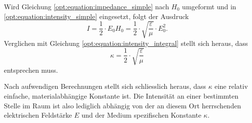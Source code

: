 Wird Gleichung \eqref{opt:equation:impedance_simple} nach $H_0$ umgeformt und in \eqref{opt:equation:intensity_simple} eingesetzt, folgt der Ausdruck
\begin{equation*}
I
=
\frac{1}{2} \cdot E_0 H_0
=
\frac{1}{2} \cdot \sqrt{\frac{\varepsilon}{\mu}} \cdot E_0^2
.
\end{equation*}
Verglichen mit Gleichung \eqref{opt:equation:intensity_integral} stellt sich heraus, dass
\begin{equation*}
\kappa
=
\frac{1}{2} \cdot \sqrt{\frac{\varepsilon}{\mu}}
\end{equation*}
entsprechen muss.

Nach aufwendigen Berechnungen stellt sich schliesslich heraus, dass $\kappa$ eine relativ einfache, materialabhängige Konstante ist.
Die Intensität an einer bestimmten Stelle im Raum ist also lediglich abhängig von der an diesem Ort herrschenden elektrischen Feldstärke $E$ und der Medium spezifischen Konstante $\kappa$.


